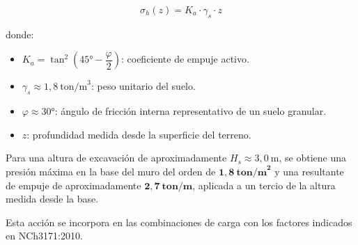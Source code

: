 \[
    \sigma_h(z) = K_a \cdot \gamma_s \cdot z
\]

donde:
\begin{itemize}
    \item $K_a = \tan^2\!\left(45° - \dfrac{\varphi}{2}\right)$: coeficiente de empuje activo.
    \item $\gamma_s \approx 1{,}8\ \text{ton/m}^3$: peso unitario del suelo.
    \item $\varphi \approx 30°$: ángulo de fricción interna representativo de un suelo granular.
    \item $z$: profundidad medida desde la superficie del terreno.
\end{itemize}

Para una altura de excavación de aproximadamente $H_s \approx 3{,}0\ \text{m}$, se obtiene una presión máxima en la base del muro del orden de $\mathbf{1{,}8\ \text{ton/m}^2}$ y una resultante de empuje de aproximadamente $\mathbf{2{,}7\ \text{ton/m}}$, aplicada a un tercio de la altura medida desde la base.

Esta acción se incorpora en las combinaciones de carga con los factores indicados en NCh3171:2010.